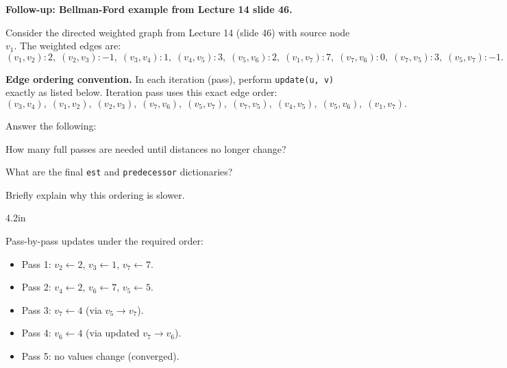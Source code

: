 \begin{prob}
    \textbf{Follow-up: Bellman-Ford example from Lecture 14 slide 46.}

    Consider the directed weighted graph from Lecture 14 (slide 46) with source node $v_1$.
    The weighted edges are:
    \[
        (v_1,v_2):2,\;
        (v_2,v_3):-1,\;
        (v_3,v_4):1,\;
        (v_4,v_5):3,\;
        (v_5,v_6):2,\;
        (v_1,v_7):7,\;
        (v_7,v_6):0,\;
        (v_7,v_5):3,\;
        (v_5,v_7):-1.
    \]

    \textbf{Edge ordering convention.}
    In each iteration (pass), perform \texttt{update(u, v)} exactly as listed below.
    Iteration pass uses this exact edge order:
    \[
        (v_3,v_4),\; (v_1,v_2),\; (v_2,v_3),\; (v_7,v_6),\; (v_5,v_7),\;
        (v_7,v_5),\; (v_4,v_5),\; (v_5,v_6),\; (v_1,v_7).
    \]

    Answer the following:
    \begin{subprobset}
        \begin{subprob}
            How many full passes are needed until distances no longer change?
        \end{subprob}
        \begin{subprob}
            What are the final \texttt{est} and \texttt{predecessor} dictionaries?
        \end{subprob}
        \begin{subprob}
            Briefly explain why this ordering is slower.
        \end{subprob}
    \end{subprobset}

    \begin{responsebox}{4.2in}
    \end{responsebox}

    \begin{soln}
        Pass-by-pass updates under the required order:
        \begin{itemize}
            \item Pass 1: $v_2 \leftarrow 2$, $v_3 \leftarrow 1$, $v_7 \leftarrow 7$.
            \item Pass 2: $v_4 \leftarrow 2$, $v_6 \leftarrow 7$, $v_5 \leftarrow 5$.
            \item Pass 3: $v_7 \leftarrow 4$ (via $v_5 \to v_7$).
            \item Pass 4: $v_6 \leftarrow 4$ (via updated $v_7 \to v_6$).
            \item Pass 5: no values change (converged).
        \end{itemize}


\end{soln}
\end{prob}
